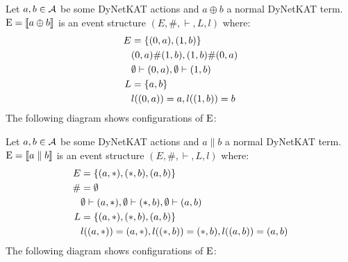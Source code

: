 \begin{example}
    Let $a,b\in \mathcal{A}$ be some DyNetKAT actions and $a\oplus b$ a
    normal DyNetKAT term.
    $\mathrm{E} = \llbracket a\oplus b \rrbracket$ is an event structure
    $(E,\#,\vdash,L,l)$ where:
    \begin{align*}
        E & = \{(0,a),(1,b)\}                \\
          & (0,a) \# (1,b) , (1,b) \# (0,a)  \\
          & \emptyset \vdash (0,a), \emptyset \vdash (1,b) \\
        L & = \{a,b\}                        \\
          & l((0,a)) = a, l((1,b)) = b       
    \end{align*}
    The following diagram shows configurations of $\mathrm{E}$:
    \begin{center}
    \end{center}
\end{example}


\begin{example}
    Let $a,b\in \mathcal{A}$ be some DyNetKAT actions and $a\parallel b$ a
    normal DyNetKAT term.
    $\mathrm{E} = \llbracket a\parallel b \rrbracket$ is an event structure
    $(E,\#,\vdash,L,l)$ where:
    \begin{align*}
        E  & = \{(a,*),(*,b),(a,b)\}                           \\
        \# & = \emptyset                                              \\
           & \emptyset \vdash (a,*), \emptyset \vdash (*,b),\emptyset \vdash (a,b)  \\
        L  & = \{(a,*),(*,b),(a,b)\}                           \\
           & l((a,*)) = (a,*), l((*,b)) = (*,b),l((a,b))=(a,b) 
    \end{align*}
    The following diagram shows configurations of $\mathrm{E}$:
    \begin{center}
    \end{center}
\end{example}